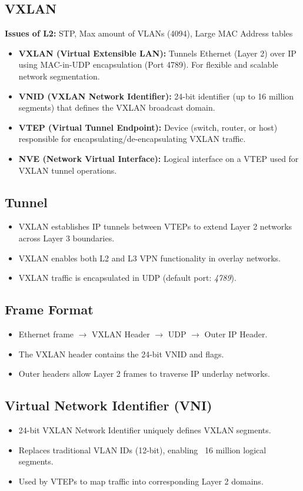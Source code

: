 \begin{multicols*}{5}
		\section{VXLAN}
		\textbf{Issues of L2:} STP, Max amount of VLANs (4094), Large MAC Address tables
		\begin{itemize}
			\item \textbf{VXLAN (Virtual Extensible LAN):} Tunnels Ethernet (Layer 2) over IP using MAC-in-UDP encapsulation (Port 4789). For flexible and scalable network segmentation.
			\item \textbf{VNID (VXLAN Network Identifier):} 24-bit identifier (up to 16 million segments) that defines the VXLAN broadcast domain.
			\item \textbf{VTEP (Virtual Tunnel Endpoint):} Device (switch, router, or host) responsible for encapsulating/de-encapsulating VXLAN traffic.
			\item \textbf{NVE (Network Virtual Interface):} Logical interface on a VTEP used for VXLAN tunnel operations.
		\end{itemize}
		
		\subsection{Tunnel}
		\begin{itemize}
			\item VXLAN establishes IP tunnels between VTEPs to extend Layer 2 networks across Layer 3 boundaries.
			\item VXLAN enables both L2 and L3 VPN functionality in overlay networks.
			\item VXLAN traffic is encapsulated in UDP (default port: \textit{4789}).
		\end{itemize}
		
		\subsection{Frame Format}
		\begin{itemize}
			\item Ethernet frame $\rightarrow$ VXLAN Header $\rightarrow$ UDP $\rightarrow$ Outer IP Header.
			\item The VXLAN header contains the 24-bit VNID and flags.
			\item Outer headers allow Layer 2 frames to traverse IP underlay networks.
		\end{itemize}
		
		\subsection{Virtual Network Identifier (VNI)}
		\begin{itemize}
			\item 24-bit VXLAN Network Identifier uniquely defines VXLAN segments.
			\item Replaces traditional VLAN IDs (12-bit), enabling ~16 million logical segments.
			\item Used by VTEPs to map traffic into corresponding Layer 2 domains.
		\end{itemize}
		

\end{multicols*}
